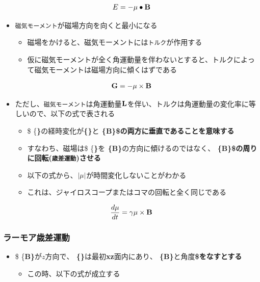 \documentclass[11pt]{article}
\providecommand{\tightlist}{%
      \setlength{\itemsep}{0pt}\setlength{\parskip}{0pt}}
\begin{document}
\begin{eqnarray}
E = - \mu\bullet {\bf B}
\end{eqnarray}

\begin{itemize}
\item
  \texttt{磁気モーメント}が磁場方向を向くと最小になる

  \begin{itemize}
  \item
    磁場をかけると、磁気モーメントには\texttt{トルク}が作用する
  \item
    仮に磁気モーメントが全く角運動量を伴わないとすると、トルクによって磁気モーメントは磁場方向に傾くはずである
  \end{itemize}
\end{itemize}

\begin{eqnarray}
{\bf G} = - \mu\times {\bf B}
\end{eqnarray}

    \begin{itemize}
\item
  ただし、\texttt{磁気モーメント}は角運動量\({\bf L}\)を伴い、トルクは角運動量の変化率に等しいので、以下の式で表される

  \begin{itemize}
  \item
    \$ \{\bf \mu\}\(の経時変化が\)\{\bf \mu\}\(と\)
    \{\bf B\}\$の両方に垂直であることを意味する
  \item
    すなわち、磁場は\$ \{\bf \mu\}\(を\)
    \{\bf B\}\(の方向に傾けるのではなく、\)
    \{\bf B\}\$の周りに回転(\texttt{歳差運動})させる
  \item
    以下の式から、\(| {\bf \mu}|\)が時間変化しないことがわかる
  \item
    これは、ジャイロスコープまたはコマの回転と全く同じである
  \end{itemize}
\end{itemize}

\begin{eqnarray}
\frac{d{\bf \mu}}{dt} = \gamma {\bf \mu}\times {\bf B}
\end{eqnarray}

    \subsubsection{ラーモア歳差運動}\label{ux30e9ux30fcux30e2ux30a2ux6b73ux5deeux904bux52d5}

\begin{itemize}
\item
  \$ \{\bf B\}\(がz方向で、\) \{\bf \mu\}\(は最初\)xz\(面内にあり、\)
  \{\bf B\}\(と角度\)\theta\$をなすとする

  \begin{itemize}
  \tightlist
  \item
    この時、以下の式が成立する
  \end{itemize}
\end{itemize}
\end{document}
